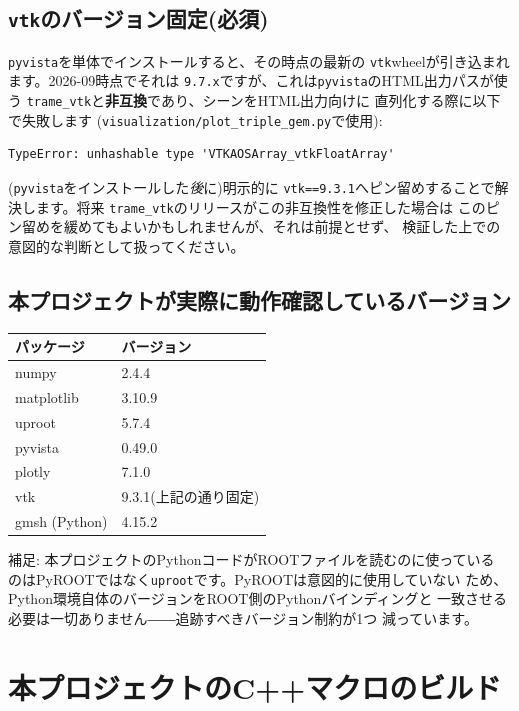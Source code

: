 \documentclass[11pt]{ltjsarticle}
\begin{document}
\subsection{\texttt{vtk}のバージョン固定(必須)}

\texttt{pyvista}を単体でインストールすると、その時点の最新の
\texttt{vtk}wheelが引き込まれます。2026-09時点でそれは
\texttt{9.7.x}ですが、これは\texttt{pyvista}のHTML出力パスが使う
\texttt{trame\_vtk}と\textbf{非互換}であり、シーンをHTML出力向けに
直列化する際に以下で失敗します
(\texttt{visualization/plot\_triple\_gem.py}で使用):
\begin{lstlisting}
TypeError: unhashable type 'VTKAOSArray_vtkFloatArray'
\end{lstlisting}
(\texttt{pyvista}をインストールした\emph{後}に)明示的に
\texttt{vtk==9.3.1}へピン留めすることで解決します。将来
\texttt{trame\_vtk}のリリースがこの非互換性を修正した場合は
このピン留めを緩めてもよいかもしれませんが、それは前提とせず、
検証した上での意図的な判断として扱ってください。

\subsection{本プロジェクトが実際に動作確認しているバージョン}

\begin{table}[h]
\centering
\begin{tabular}{@{}p{6.5cm}p{5cm}@{}}
\toprule
パッケージ & バージョン \\
\midrule
numpy & 2.4.4 \\
matplotlib & 3.10.9 \\
uproot & 5.7.4 \\
pyvista & 0.49.0 \\
plotly & 7.1.0 \\
vtk & 9.3.1(上記の通り固定) \\
gmsh (Python) & 4.15.2 \\
\bottomrule
\end{tabular}
\end{table}

補足: 本プロジェクトのPythonコードがROOTファイルを読むのに使っている
のはPyROOTではなく\texttt{uproot}です。PyROOTは意図的に使用していない
ため、Python環境自体のバージョンをROOT側のPythonバインディングと
一致させる必要は一切ありません――追跡すべきバージョン制約が1つ
減っています。

\section{本プロジェクトのC++マクロのビルド}
\end{document}
